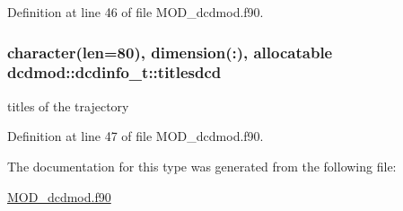Definition at line 46 of file M\-O\-D\-\_\-dcdmod.\-f90.

\hypertarget{structdcdmod_1_1dcdinfo__t_a520fe3a7b3b6f96d0c0c0221a92f521a}{
\subsubsection[{titlesdcd}]{\setlength{\rightskip}{0pt plus 5cm}character(len=80), dimension(\-:), allocatable dcdmod\-::dcdinfo\-\_\-t\-::titlesdcd}}\label{structdcdmod_1_1dcdinfo__t_a520fe3a7b3b6f96d0c0c0221a92f521a}


titles of the trajectory 



Definition at line 47 of file M\-O\-D\-\_\-dcdmod.\-f90.



The documentation for this type was generated from the following file\-:\begin{DoxyCompactItemize}
\item 
\hyperlink{MOD__dcdmod_8f90}{M\-O\-D\-\_\-dcdmod.\-f90}\end{DoxyCompactItemize}

